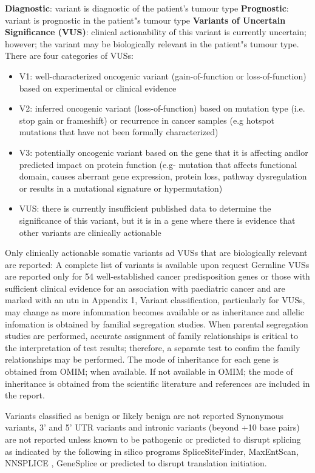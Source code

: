 \documentclass[8pt,letterpaper]{extarticle}
\begin{document}
{{\bf Diagnostic}: variant is diagnostic of the patient's tumour type 
{\bf Prognostic}: variant is prognostic in the patient"s tumour type 
{\bf Variants of Uncertain Significance (VUS)}: clinical actionability of this variant is currently uncertain; however; the variant may be biologically relevant in the patient"s tumour type. There are four categories of VUSs: 
\begin{itemize}
  \setlength\itemsep{1pt}
  \item V1: well-characterized oncogenic variant (gain-of-function or loss-of-function) based on experimental or clinical evidence 
  \item V2: inferred oncogenic variant (loss-of-function) based on mutation type (i.e. stop gain or frameshift) or recurrence in cancer samples (e.g hotspot mutations that have not been formally characterized) 
  \item V3: potentially oncogenic variant based on the gene that it is affecting andlor predicted impact on protein function (e.g- mutation that affects functional domain, causes aberrant gene expression, protein loss, pathway dysregulation or results in a mutational signature or hypermutation) 
  \item VUS: there is currently insufficient published data to determine the significance of this variant, but it is in a gene where there is evidence that other variants are clinically actionable 
\end{itemize}

Only clinically actionable somatic variants ad VUSs that are biologically relevant are reported: A complete list of variants is available upon request Germline VUSs are reported only for 54 well-established cancer predisposition genes or those with sufficient clinical evidence for an association with paediatric cancer and are marked with an utn in Appendix 1, Variant classification, particularly for VUSs, may change as more infommation becomes available or as inheritance and allelic infomation is obtained by familial segregation studies. When parental segregation studies are performed, accurate assignment of family relationships is critical to the interpretation of test results; therefore, a separate test to confim the family relationships may be performed. The mode of inheritance for each gene is obtained from OMIM; when available. If not available in OMIM; the mode of inheritance is obtained from the scientific literature and references are included in the report.

Variants classified as benign or Iikely benign are not reported  Synonymous variants, 3' and 5' UTR variants and intronic variants (beyond +10 base pairs) are not reported unless known to be pathogenic or predicted to disrupt splicing as indicated by the following in silico programs SpliceSiteFinder, MaxEntScan, NNSPLICE , GeneSplice or predicted to disrupt translation initiation.

}
\end{document}
